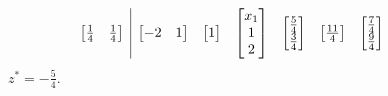\begin{equation*}
{\begin{array}{ c|c c c c c c c c c c c c c }
\begin{bmatrix}
\frac{1}{4} & \frac{1}{4}
\end{bmatrix} & \begin{bmatrix}
-2 & 1
\end{bmatrix} & \begin{bmatrix}
1
\end{bmatrix} & \begin{bmatrix}
x_{1}\\
1\\
2
\end{bmatrix} & \begin{bmatrix}
\frac{5}{4}\\
\frac{3}{4}
\end{bmatrix} & \begin{bmatrix}
\frac{11}{4}
\end{bmatrix} & \begin{bmatrix}
\frac{7}{4}\\
\frac{9}{4}
\end{bmatrix} &  &  &  & 
\end{array}
}
\end{equation*}
$z^{*} =-\frac{5}{4}$.








